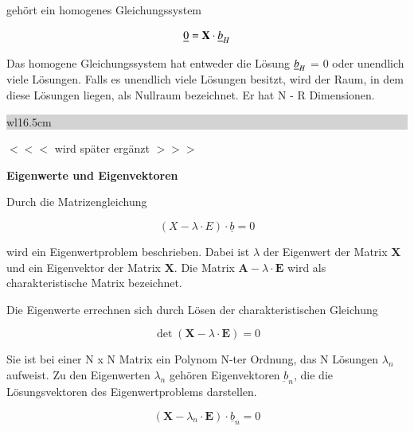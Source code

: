 \noindent geh\"{o}rt ein homogenes Gleichungssystem

\begin{equation}\label{eq:thirteenonehundrednineteen}
\underline{0}=\mathbf{X}\cdot \underline{b}_{H}
\end{equation}

\noindent Das homogene Gleichungssystem hat entweder die L\"{o}sung $\underline{b}_{H}$ = 0 oder unendlich viele L\"{o}sungen. Falls es unendlich viele L\"{o}sungen besitzt, wird der Raum, in dem diese L\"{o}sungen liegen, als Nullraum bezeichnet. Er hat N - R Dimensionen.\bigskip

\noindent
\colorbox{lightgray}{%
%
\renewcommand\arraystretch{0.6}%
\begin{tabular}{ wl{16.5cm} }
{\selectfont
{}}
\end{tabular}%
}\medskip

\noindent $<<<$ wird sp\"{a}ter erg\"{a}nzt $>>>$\bigskip

\selectfont
\noindent\textbf{Eigenwerte und Eigenvektoren} \smallskip

\noindent Durch die Matrizengleichung

\begin{equation}\label{eq:thirteenonehundredtwenty}
(X-\lambda \cdot E)\cdot \underline{b}=0
\end{equation}

\noindent wird ein Eigenwertproblem beschrieben. Dabei ist $\lambda$ der Eigenwert der Matrix $\mathbf{X}$ und  ein Eigenvektor der Matrix $\mathbf{X}$. Die Matrix $\mathbf{A} - \lambda\cdot \mathbf{E}$ wird als charakteristische Matrix bezeichnet.\newline

\noindent Die Eigenwerte errechnen sich durch L\"{o}sen der charakteristischen Gleichung

\begin{equation}\label{eq:thirteenonehundredtwentyone}
\det (\mathbf{X}-\lambda \cdot \mathbf{E})=0
\end{equation}

\noindent Sie ist bei einer N x N Matrix ein Polynom N-ter Ordnung, das N L\"{o}sungen $\lambda_{n}$ aufweist. Zu den Eigenwerten $\lambda_{n}$ geh\"{o}ren Eigenvektoren $\underbar{b}_{n}$, die die L\"{o}sungsvektoren des Eigenwertproblems darstellen.

\begin{equation}\label{eq:thirteenonehundredtwentytwo}
(\mathbf{X}-\lambda _{n} \cdot \mathbf{E})\cdot \underline{b}_{n} =0
\end{equation}

